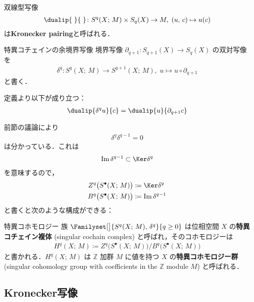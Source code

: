 \documentclass[algtopo_main]{subfiles}
\begin{document}
双線型写像
\begin{align}
    \label{def:KroneckerPairing}
    \dualip{\;}{\;} \colon S^q(X;\, M) \times S_q(X) \to M,\; (u,\, c) \mapsto u(c)
\end{align}
は\textbf{Kronecker pairing}と呼ばれる．

\begin{mydef}[label=def:SCH-cochainmap]{特異コチェインの余境界写像}
    境界写像 $\partial_{q+1} \colon S_{q+1}(X) \to S_q(X)$ の双対写像を
    \begin{align}
        \delta^q \colon S^q(X;\, M) \to S^{q+1}(X;\, M),\; u \mapsto u \circ \partial_{q+1}
    \end{align}
    と書く．
\end{mydef}
定義より以下が成り立つ：
\begin{align}
    \dualip{\delta^q u}{c} = \dualip{u}{\partial_{q+1} c}
\end{align}

前節の議論により
\begin{align}
    \delta^{q} \delta^{q-1} = 0
\end{align}
は分かっている．これは
\begin{align}
    \Im \delta^{q-1} \subset \Ker \delta^q
\end{align}
を意味するので，
\begin{align}
    Z^q\bigl(S^\bullet(X;\, M)\bigr) &\coloneqq \Ker \delta^q \\
    B^q \bigl( S^\bullet(X;\, M) \bigr) &\coloneqq \Im \delta^{q-1}
\end{align}
と書くと次のような構成ができる：
\begin{mydef}[label=def:SCH]{特異コホモロジー}
    族 $\Familyset[\big]{S^q(X;\, M),\, \delta^q}{q\ge 0}$ は位相空間 $X$ の\textbf{特異コチェイン複体} (singular cochain complex) と呼ばれ，そのコホモロジーは
    \begin{align}
        H^q(X;\, M) \coloneqq Z^q\bigl(S^\bullet(X;\, M)\bigr)/B^q\bigl(S^\bullet(X;\, M)\bigr)
    \end{align}
    と書かれる．$H^q(X;\, M)$ は $\mathbb{Z}$ 加群 $M$ に値を持つ $X$ の\textbf{特異コホモロジー群} (singular cohomology group with coefficients in the $\mathbb{Z}$ module $M$) と呼ばれる．
\end{mydef}

\subsection{Kronecker写像}
\end{document}
